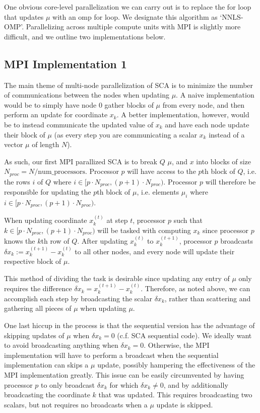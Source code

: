 \documentclass{article}
\begin{document}
One obvious core-level parallelization we can carry out is to replace the for loop that updates $\mu$ with an omp for loop. We designate this algorithm as `NNLS-OMP'. Parallelizing across multiple compute units with MPI is slightly more difficult, and we outline two implementations below.

\subsection{MPI Implementation 1}
The main theme of multi-node parallelization of SCA is to minimize the number of communications between the nodes when updating $\mu$. A naive implementation would be to simply have node 0 gather blocks of $\mu$ from every node, and then perform an update for coordinate $x_k$. A better implementation, however, would be to instead communicate the updated value of $x_k$ and have each node update their block of $\mu$ (as every step you are communicating a scalar $x_k$ instead of a vector $\mu$ of length $N$).

As such, our first MPI parallized SCA is to break $Q$ $\mu$, and $x$ into blocks of size $N_{proc} = N/\text{num\_processors}$. Processor $p$ will have access to the $p$th block of $Q$, i.e. the rows $i$ of $Q$ where $i \in [p \cdot N_{proc}, (p+1) \cdot N_{proc} )$. Processor $p$ will therefore be responsible for updating the $p$th block of $\mu$, i.e. elements $\mu_i$ where $i \in [p \cdot N_{proc}, (p+1) \cdot N_{proc} )$.

When updating coordinate $x_k^{(t)}$ at step $t$, processor $p$ such that $k \in [p \cdot N_{proc}, (p+1) \cdot N_{proc} )$ will be tasked with computing $x_k$ since processor $p$ knows the $k$th row of $Q$. After updating $x_k^{(t)}$ to $x_k^{(t+1)}$, processor $p$ broadcasts $\delta x_k := x_k^{(t+1)} - x_k^{(t)}$ to all other nodes, and every node will update their respective block of $\mu$.

This method of dividing the task is desirable since updating any entry of $\mu$ only requires the difference $\delta x_k = x_k^{(t+1)} - x_k^{(t)}$. Therefore, as noted above, we can accomplish each step by broadcasting the scalar $\delta x_k$, rather than scattering and gathering all pieces of $\mu$ when updating $\mu$.

One last hiccup in the process is that the sequential version has the advantage of skipping updates of $\mu$ when $\delta x_k = 0$ (c.f. SCA sequential code). We ideally want to avoid broadcasting anything when $\delta x_k = 0$. Otherwise, the MPI implementation will have to perform a broadcast when the sequential implementation can skips a $\mu$ update, possibly hampering the effectiveness of the MPI implementation greatly. This issue can be easily circumvented by having processor $p$ to only broadcast $\delta x_k$ for which $\delta x_k \neq 0$, and by additionally broadcasting the coordinate $k$ that was updated. This requires broadcasting two scalars, but not requires no broadcasts when a $\mu$ update is skipped.
\end{document}
